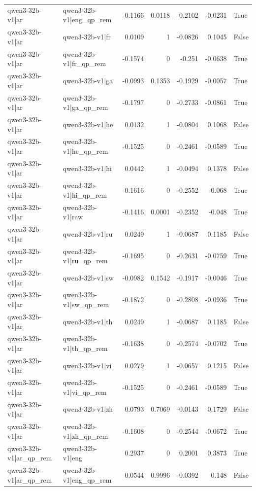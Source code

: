 \begin{table}
\begin{tabular}{l l r r r r l}
qwen3-32b-v1|ar & qwen3-32b-v1|eng_qp_rem & -0.1166 & 0.0118 & -0.2102 & -0.0231 & True \\
qwen3-32b-v1|ar & qwen3-32b-v1|fr & 0.0109 & 1 & -0.0826 & 0.1045 & False \\
qwen3-32b-v1|ar & qwen3-32b-v1|fr_qp_rem & -0.1574 & 0 & -0.251 & -0.0638 & True \\
qwen3-32b-v1|ar & qwen3-32b-v1|ga & -0.0993 & 0.1353 & -0.1929 & -0.0057 & True \\
qwen3-32b-v1|ar & qwen3-32b-v1|ga_qp_rem & -0.1797 & 0 & -0.2733 & -0.0861 & True \\
qwen3-32b-v1|ar & qwen3-32b-v1|he & 0.0132 & 1 & -0.0804 & 0.1068 & False \\
qwen3-32b-v1|ar & qwen3-32b-v1|he_qp_rem & -0.1525 & 0 & -0.2461 & -0.0589 & True \\
qwen3-32b-v1|ar & qwen3-32b-v1|hi & 0.0442 & 1 & -0.0494 & 0.1378 & False \\
qwen3-32b-v1|ar & qwen3-32b-v1|hi_qp_rem & -0.1616 & 0 & -0.2552 & -0.068 & True \\
qwen3-32b-v1|ar & qwen3-32b-v1|raw & -0.1416 & 0.0001 & -0.2352 & -0.048 & True \\
qwen3-32b-v1|ar & qwen3-32b-v1|ru & 0.0249 & 1 & -0.0687 & 0.1185 & False \\
qwen3-32b-v1|ar & qwen3-32b-v1|ru_qp_rem & -0.1695 & 0 & -0.2631 & -0.0759 & True \\
qwen3-32b-v1|ar & qwen3-32b-v1|sw & -0.0982 & 0.1542 & -0.1917 & -0.0046 & True \\
qwen3-32b-v1|ar & qwen3-32b-v1|sw_qp_rem & -0.1872 & 0 & -0.2808 & -0.0936 & True \\
qwen3-32b-v1|ar & qwen3-32b-v1|th & 0.0249 & 1 & -0.0687 & 0.1185 & False \\
qwen3-32b-v1|ar & qwen3-32b-v1|th_qp_rem & -0.1638 & 0 & -0.2574 & -0.0702 & True \\
qwen3-32b-v1|ar & qwen3-32b-v1|vi & 0.0279 & 1 & -0.0657 & 0.1215 & False \\
qwen3-32b-v1|ar & qwen3-32b-v1|vi_qp_rem & -0.1525 & 0 & -0.2461 & -0.0589 & True \\
qwen3-32b-v1|ar & qwen3-32b-v1|zh & 0.0793 & 0.7069 & -0.0143 & 0.1729 & False \\
qwen3-32b-v1|ar & qwen3-32b-v1|zh_qp_rem & -0.1608 & 0 & -0.2544 & -0.0672 & True \\
qwen3-32b-v1|ar_qp_rem & qwen3-32b-v1|eng & 0.2937 & 0 & 0.2001 & 0.3873 & True \\
qwen3-32b-v1|ar_qp_rem & qwen3-32b-v1|eng_qp_rem & 0.0544 & 0.9996 & -0.0392 & 0.148 & False \\

\end{tabular}
\end{table}
